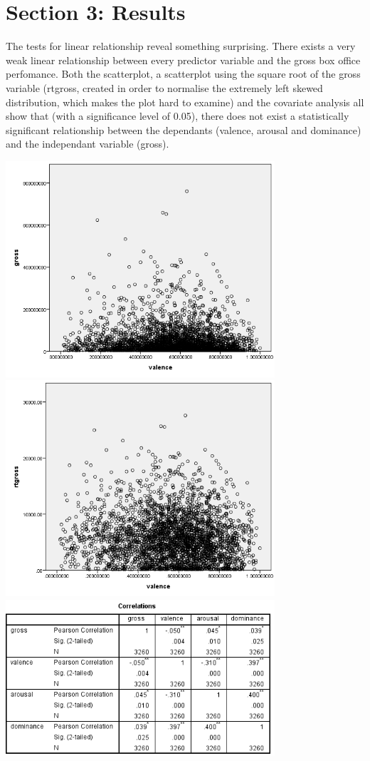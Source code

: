 \documentclass[font=10pt]{article}
\begin{document}
  \section{Section 3: Results}
The tests for linear relationship reveal something surprising. There exists a very weak linear relationship between every predictor variable and the gross box office perfomance. Both the scatterplot, a scatterplot using the square root of the gross variable (rtgross, created in order to normalise the extremely left skewed distribution, which makes the plot hard to examine) and the covariate analysis all show that (with a significance level of 0.05), there does not exist a statistically significant relationship between the dependants (valence, arousal and dominance) and the independant variable (gross).
\newline
\begin{center}
	\includegraphics[width=10cm]{grosstovalence.png}
\newline
 	\includegraphics[width=10cm]{rtgrosstovalence.png}
\newline
	\includegraphics[width = 10cm]{correlations}
\end{center}
\end{document}
